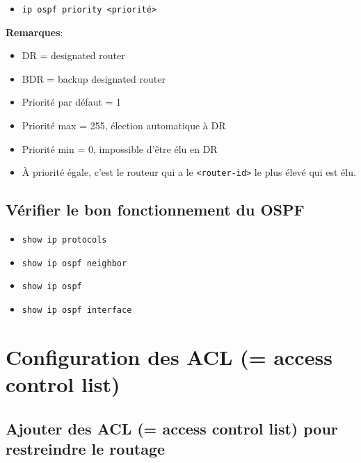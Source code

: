 \documentclass[a4paper]{article}
\begin{document}
\begin{itemize}[label=\textbf{–}]
    \item \texttt{ip ospf priority <priorité>}
\end{itemize}
\textbf{Remarques}:
\begin{itemize}
    \item DR = designated router
    \item BDR = backup designated router
    \item Priorité par défaut = 1
    \item Priorité max = 255, élection automatique à DR
    \item Priorité min = 0, impossible d'être élu en DR
    \item À priorité égale, c'est le routeur qui a le \texttt{<router-id>} le plus élevé qui est élu.
\end{itemize}










\subsection{Vérifier le bon fonctionnement du OSPF}



\begin{itemize}[label=\textbf{–}]
    \item \texttt{show ip protocols}
    \item \texttt{show ip ospf neighbor}
    \item \texttt{show ip ospf}
    \item \texttt{show ip ospf interface}
\end{itemize}










\section{Configuration des ACL (= access control list)}





\subsection{Ajouter des ACL (= access control list) pour restreindre le routage}
\end{document}
